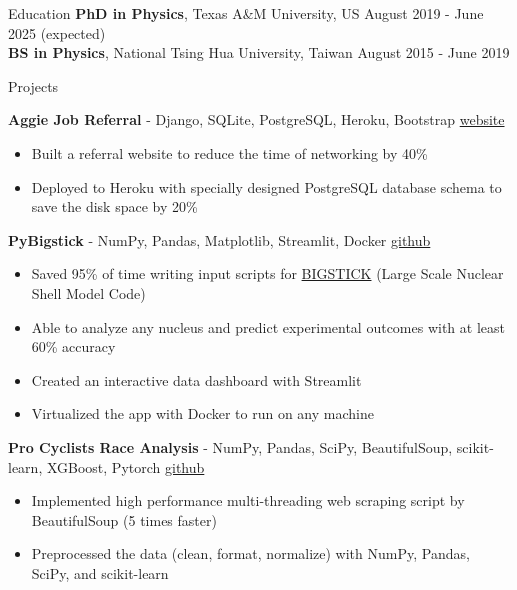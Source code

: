 \documentclass{resume}
\begin{document}
\vspace{-2.75em}
\begin{rSection}{Education}
{\bf PhD in Physics}, Texas A\&M University, US \hfill {August 2019 - June 2025 (expected)} \\
{\bf BS in Physics}, National Tsing Hua University, Taiwan \hfill {August 2015 - June 2019}
\vspace{-0.5em}


\begin{rSection}{Projects}
    \vspace{-1.25em}
    \item \textbf{Aggie Job Referral} - {Django, SQLite, PostgreSQL, Heroku, Bootstrap} \hfill {\href{https://boiling-hollows-75833.herokuapp.com/}{website}}
        \begin{itemize}
        \itemsep -3pt {}
        \item Built a referral website to reduce the time of networking by 40\%
        \item Deployed to Heroku with specially designed PostgreSQL database schema to save the disk space by 20\%
        \end{itemize}
    \item \textbf{PyBigstick} - {NumPy, Pandas, Matplotlib, Streamlit, Docker} \hfill {\href{https://github.com/noctildon/pyBigstick}{github}}
        \begin{itemize}
        \itemsep -3pt {}
        \item Saved 95\% of time writing input scripts for \href{https://github.com/cwjsdsu/BigstickPublick}{BIGSTICK} (Large Scale Nuclear Shell Model Code)
        \item Able to analyze any nucleus and predict experimental outcomes with at least 60\% accuracy
        \item Created an interactive data dashboard with Streamlit
        \item Virtualized the app with Docker to run on any machine
        \end{itemize}
    \item \textbf{Pro Cyclists Race Analysis} - {NumPy, Pandas, SciPy, BeautifulSoup, scikit-learn, XGBoost, Pytorch} \hfill {\href{https://github.com/noctildon/pro_cyclists}{github}}
        \begin{itemize}
        \itemsep -3pt {}
        \item Implemented high performance multi-threading web scraping script by BeautifulSoup (5 times faster)
        \item Preprocessed the data (clean, format, normalize) with NumPy, Pandas, SciPy, and scikit-learn

\end{itemize}
\end{rSection}
\end{rSection}
\end{document}
